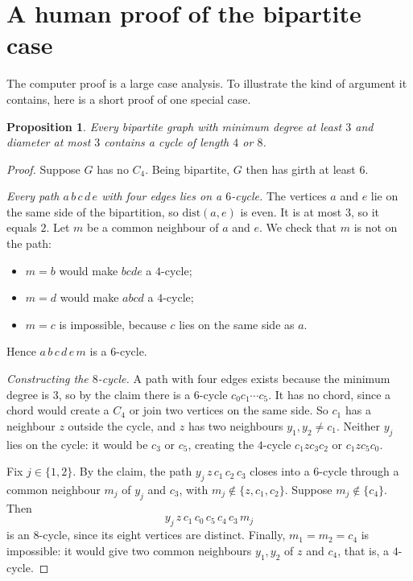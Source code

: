 \documentclass[11pt]{article}
\newtheorem{proposition}[theorem]{Proposition}
\theoremstyle{remark}
\begin{document}
\section{A human proof of the bipartite case}

The computer proof is a large case analysis. To illustrate the kind of argument it contains, here
is a short proof of one special case.

\begin{proposition}
Every bipartite graph with minimum degree at least $3$ and diameter at most $3$ contains a cycle of
length $4$ or $8$.
\end{proposition}

\begin{proof}
Suppose $G$ has no $C_4$. Being bipartite, $G$ then has girth at least $6$.

\emph{Every path $a\,b\,c\,d\,e$ with four edges lies on a $6$-cycle.} The vertices $a$ and $e$ lie
on the same side of the bipartition, so $\mathrm{dist}(a,e)$ is even. It is at most $3$, so it
equals $2$. Let $m$ be a common neighbour of $a$ and $e$. We check that $m$ is not on the path:
\begin{itemize}
\item $m=b$ would make $b c d e$ a $4$-cycle;
\item $m=d$ would make $a b c d$ a $4$-cycle;
\item $m=c$ is impossible, because $c$ lies on the same side as $a$.
\end{itemize}
Hence $a\,b\,c\,d\,e\,m$ is a $6$-cycle.

\emph{Constructing the $8$-cycle.} A path with four edges exists because the minimum degree is $3$,
so by the claim there is a $6$-cycle $c_0c_1\cdots c_5$. It has no chord, since a chord would create
a $C_4$ or join two vertices on the same side. So $c_1$ has a neighbour $z$ outside the cycle, and
$z$ has two neighbours $y_1,y_2\neq c_1$. Neither $y_j$ lies on the cycle: it would be $c_3$ or
$c_5$, creating the $4$-cycle $c_1zc_3c_2$ or $c_1zc_5c_0$.

Fix $j\in\{1,2\}$. By the claim, the path $y_j\,z\,c_1\,c_2\,c_3$ closes into a $6$-cycle through a
common neighbour $m_j$ of $y_j$ and $c_3$, with $m_j\notin\{z,c_1,c_2\}$. Suppose
$m_j\notin\{c_4\}$. Then
\[
y_j\,z\,c_1\,c_0\,c_5\,c_4\,c_3\,m_j
\]
is an $8$-cycle, since its eight vertices are distinct. Finally, $m_1=m_2=c_4$ is impossible: it
would give two common neighbours $y_1,y_2$ of $z$ and $c_4$, that is, a $4$-cycle.
\end{proof}
\end{document}
